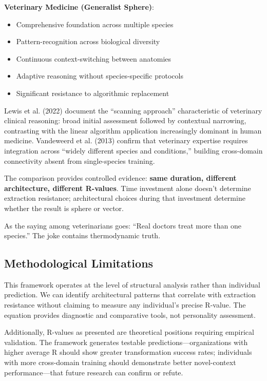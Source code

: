 \textbf{Veterinary Medicine (Generalist Sphere)}:
\begin{itemize}
    \item Comprehensive foundation across multiple species
    \item Pattern-recognition across biological diversity
    \item Continuous context-switching between anatomies
    \item Adaptive reasoning without species-specific protocols
    \item Significant resistance to algorithmic replacement
\end{itemize}

Lewis et al. (2022) document the ``scanning approach'' characteristic of veterinary clinical reasoning: broad initial assessment followed by contextual narrowing, contrasting with the linear algorithm application increasingly dominant in human medicine. Vandeweerd et al. (2013) confirm that veterinary expertise requires integration across ``widely different species and conditions,'' building cross-domain connectivity absent from single-species training.

The comparison provides controlled evidence: \textbf{same duration, different architecture, different R-values}. Time investment alone doesn't determine extraction resistance; architectural choices during that investment determine whether the result is sphere or vector.

As the saying among veterinarians goes: ``Real doctors treat more than one species.'' The joke contains thermodynamic truth.

\subsection{Methodological Limitations}

This framework operates at the level of structural analysis rather than individual prediction. We can identify architectural patterns that correlate with extraction resistance without claiming to measure any individual's precise R-value. The equation provides diagnostic and comparative tools, not personality assessment.

Additionally, R-values as presented are theoretical positions requiring empirical validation. The framework generates testable predictions---organizations with higher average R should show greater transformation success rates; individuals with more cross-domain training should demonstrate better novel-context performance---that future research can confirm or refute.

